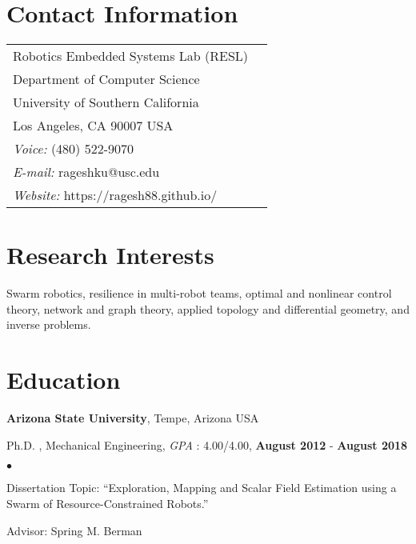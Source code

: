 \documentclass[margin,line]{res}
\newenvironment{list1}{
  \begin{list}{\ding{113}}{%
      \setlength{\itemsep}{0in}
      \setlength{\parsep}{0in} \setlength{\parskip}{0in}
      \setlength{\topsep}{0in} \setlength{\partopsep}{0in} 
      \setlength{\leftmargin}{0.17in}}}{\end{list}}
\newenvironment{list2}{
  \begin{list}{$\bullet$}{%
      \setlength{\itemsep}{0in}
      \setlength{\parsep}{0in} \setlength{\parskip}{0in}
      \setlength{\topsep}{0in} \setlength{\partopsep}{0in} 
      \setlength{\leftmargin}{0.2in}}}{\end{list}}
\begin{document}

\begin{resume}
\section{\sc Contact Information}
\vspace{.05in}
\begin{tabular}{@{}p{3.5in}p{4in}}
Robotics Embedded Systems Lab (RESL)             &  \\            
Department of Computer Science   & \\  %
University of Southern California & \\       
Los Angeles, CA  90007 USA  &  \\     %
{\it Voice:}  (480) 522-9070 & \\
{\it E-mail:}  rageshku@usc.edu & \\
{\it Website:}  https://ragesh88.github.io/ & \\
\end{tabular}


\section{\sc Research Interests}
Swarm robotics, resilience in multi-robot teams, optimal and nonlinear control theory, network and graph  theory,  applied topology and differential geometry, and inverse problems.

\section{\sc Education}
{\bf Arizona State University}, Tempe, Arizona USA\\
\vspace*{-.1in}
\begin{list1}
\item[] Ph.D. , Mechanical Engineering, \textit{GPA } : 4.00/4.00, \textbf{August 2012} - \textbf{August 2018}
\begin{list2}
\vspace*{.05in}
\item Dissertation Topic:  ``Exploration, Mapping and Scalar Field Estimation using a Swarm of Resource-Constrained Robots.'' 

\item Advisor:  Spring M. Berman
\end{list2}
\vspace*{.05in}
\end{list1}


\end{resume}
\end{document}
